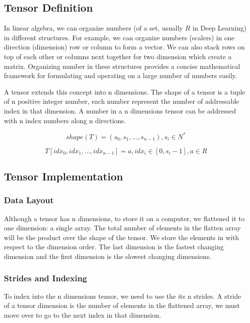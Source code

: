 \documentclass[conference]{IEEEtran}
\begin{document}
\subsection{Tensor Definition}
In linear algebra, we can organize numbers (of a set, usually \(R\) in Deep Learning) in different structures.
For example, we can organize numbers (scalers) in one direction (dimension) row or column to form a vector.
We can also stack rows on top of each other or columns next together for two dimension which create a matrix.
Organizing number in these structures provides a concise mathematical framework for formulating and operating on a large number of numbers easily.

A tensor extends this concept into n dimensions. The shape of a tensor is a tuple of n positive integer number, each number represent the number of addressable index in that dimension. 
A number in a n dimensions tensor can be addressed with n index numbers along n directions.

\begin{equation}
shape(T) = (s_0,s_1,...,s_{n -1}),  s_i \in N^*\label{tensor-def}
\end{equation}

\begin{equation}
T[idx_0,idx_1,...,idx_{n-1}] = a, idx_i \in [0,s_i-1],a\in R \label{tensor-def}
\end{equation}

\subsection{Tensor Implementation}
\subsubsection{Data Layout}
Although a tensor has n dimensions, to store it on a computer, we flattened it to one dimension: a single array.
The total number of elements in the flatten array will be the product over the shape of the tensor.
We store the elements in with respect to the dimension order. The last dimension is the fastest changing dimension and the first dimension is the slowest changing dimensions.

\subsubsection{Strides and Indexing}
To index into the n dimensions tensor, we need to use the its n strides. A stride of a tensor dimension is the number of elements in the flattened array, we must move over to go to the next index in that dimension.
\end{document}
